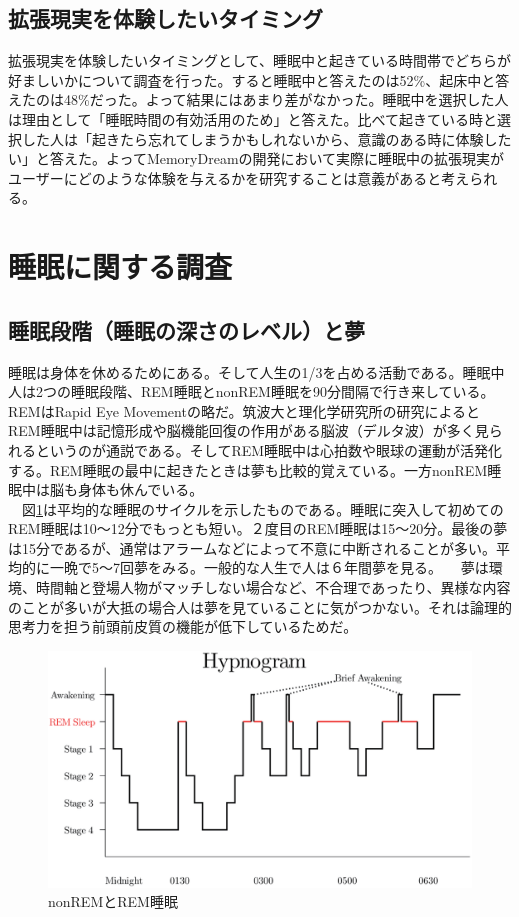 \subsection{拡張現実を体験したいタイミング}
拡張現実を体験したいタイミングとして、睡眠中と起きている時間帯でどちらが好ましいかについて調査を行った。すると睡眠中と答えたのは52\%、起床中と答えたのは48\%だった。よって結果にはあまり差がなかった。睡眠中を選択した人は理由として「睡眠時間の有効活用のため」と答えた。比べて起きている時と選択した人は「起きたら忘れてしまうかもしれないから、意識のある時に体験したい」と答えた。よってMemoryDreamの開発において実際に睡眠中の拡張現実がユーザーにどのような体験を与えるかを研究することは意義があると考えられる。


\section{睡眠に関する調査}
\subsection{睡眠段階（睡眠の深さのレベル）と夢}
睡眠は身体を休めるためにある。そして人生の1/3を占める活動である。睡眠中人は2つの睡眠段階、REM睡眠とnonREM睡眠を90分間隔で行き来している\cite{Dement}。REMはRapid Eye Movementの略だ。筑波大と理化学研究所の研究によるとREM睡眠中は記憶形成や脳機能回復の作用がある脳波（デルタ波）が多く見られるというのが通説である\cite{tsukuba}。そしてREM睡眠中は心拍数や眼球の運動が活発化する。REM睡眠の最中に起きたときは夢も比較的覚えている\cite{remNonRem}。一方nonREM睡眠中は脳も身体も休んでいる。\\
　図\ref{SleepHypnogram}は平均的な睡眠のサイクルを示したものである。睡眠に突入して初めてのREM睡眠は10〜12分でもっとも短い。２度目のREM睡眠は15〜20分。最後の夢は15分であるが、通常はアラームなどによって不意に中断されることが多い。平均的に一晩で5〜7回夢をみる。一般的な人生で人は６年間夢を見る。
　夢は環境、時間軸と登場人物がマッチしない場合など、不合理であったり、異様な内容のことが多いが大抵の場合人は夢を見ていることに気がつかない。それは論理的思考力を担う前頭前皮質の機能が低下しているためだ\cite{cortex}。

\begin{figure}[htbp]
\begin{center}
\includegraphics[width=15cm]{eps/SleepHypnogram.eps}
\caption{nonREMとREM睡眠}
\label{SleepHypnogram}
\end{center}
\end{figure}

